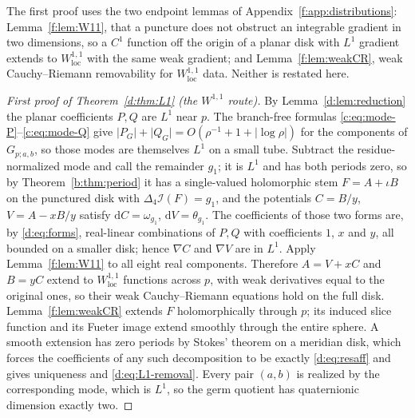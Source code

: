 \documentclass[11pt,a4paper]{article}
\numberwithin{equation}{section}
\theoremstyle{definition}
\theoremstyle{remark}
\theoremstyle{plain}
\newcommand{\lap}{\Delta_4}
\newcommand{\I}{\mathcal I}
\newcommand{\om}{\omega}
\newcommand{\thet}{\theta}
\newcommand{\pot}{C}          %
\newcommand{\potV}{V}         %
\newcommand{\abs}[1]{\lvert #1\rvert}
\newcommand{\dd}{\mathrm d}
\begin{document}
The first proof uses the two endpoint lemmas of
Appendix~\ref{f:app:distributions}: Lemma~\ref{f:lem:W11}, that a puncture
does not obstruct an integrable gradient in two dimensions, so a $C^1$
function off the origin of a planar disk with $L^1$ gradient extends to
$W^{1,1}_{\mathrm{loc}}$ with the same weak gradient; and
Lemma~\ref{f:lem:weakCR}, weak Cauchy--Riemann removability for
$W^{1,1}_{\mathrm{loc}}$ data.  Neither is restated here.

\begin{proof}[First proof of Theorem~\textup{\ref{d:thm:L1}} (the $W^{1,1}$
route)]
By Lemma~\ref{d:lem:reduction} the planar coefficients $P,Q$ are $L^1$ near
$p$.  The branch-free formulas
\eqref{c:eq:mode-P}--\eqref{c:eq:mode-Q} give
$\abs{P_{G}}+\abs{Q_{G}}=O(\rho^{-1}+1+\abs{\log\rho})$ for the components
of $G_{p;a,b}$, so those modes are themselves $L^1$ on a small tube.
Subtract the residue-normalized mode and call the remainder $g_1$; it is
$L^1$ and has both periods zero, so by Theorem~\ref{b:thm:period} it has a
single-valued
holomorphic stem $F=A+\iota B$ on the punctured disk with
$\lap\I(F)=g_1$, and the potentials $\pot=B/y$, $\potV=A-xB/y$ satisfy
$\dd\pot=\om_{g_1}$, $\dd\potV=\thet_{g_1}$.  The coefficients of those two
forms are, by \eqref{d:eq:forms}, real-linear combinations of $P,Q$ with
coefficients $1$, $x$ and $y$, all bounded on a smaller disk; hence
$\nabla\pot$ and $\nabla\potV$ are in $L^1$.  Apply
Lemma~\ref{f:lem:W11} to all eight real components.  Therefore $A=\potV+x\pot$ and $B=y\pot$
extend to $W^{1,1}_{\mathrm{loc}}$ functions across $p$, with weak
derivatives equal to the original ones, so their weak Cauchy--Riemann
equations hold on the full disk.  Lemma~\ref{f:lem:weakCR} extends $F$
holomorphically through $p$; its induced slice function and its Fueter
image extend smoothly through the entire sphere.  A smooth extension has
zero periods by Stokes' theorem on a meridian disk, which forces the
coefficients of any such decomposition to be exactly \eqref{d:eq:resaff}
and gives uniqueness and \eqref{d:eq:L1-removal}.  Every pair $(a,b)$ is
realized by the corresponding mode, which is $L^1$, so the germ quotient
has quaternionic dimension exactly two.
\end{proof}
\end{document}
